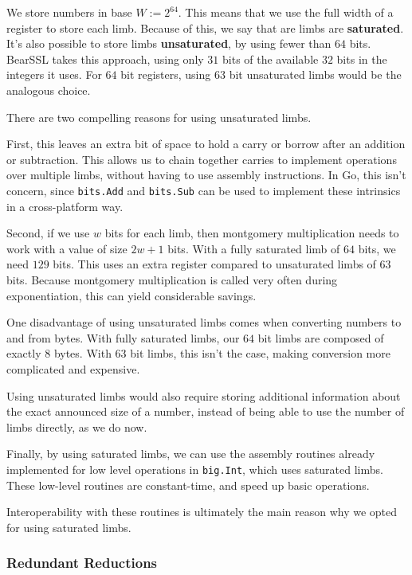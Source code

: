 \documentclass[11pt, a4paper]{article} %
\begin{document}
{We store numbers in base
$W := 2^{64}$. This means that we use the full width of a register
to store each limb. Because of this, we say that are limbs
are \textbf{saturated}. It's also possible to store
limbs \textbf{unsaturated}, by using fewer than $64$ bits.
BearSSL 
\cite{pornin_bearssl_2020-1}
takes this approach, using only $31$ bits of the available $32$ bits
in the integers it uses. For $64$ bit registers, using $63$ bit unsaturated
limbs would be the analogous choice.

There are two compelling reasons for using unsaturated limbs.

First, this leaves an extra bit of space to hold a carry
or borrow after an addition or subtraction. This allows
us to chain together carries to implement operations over multiple
limbs, without having to use assembly instructions. In Go,
this isn't concern, since \texttt{bits.Add} and
\texttt{bits.Sub} can be used to implement these intrinsics
in a cross-platform way.

Second, if we use $w$ bits for each limb, then montgomery
multiplication needs to work with a value of size $2w + 1$ bits. With a fully
saturated limb of $64$ bits, we need $129$ bits. This uses
an extra register compared to unsaturated limbs of $63$ bits. Because
montgomery multiplication is called very often during exponentiation,
this can yield considerable savings.

One disadvantage of using unsaturated limbs comes when converting
numbers to and from bytes. With fully saturated limbs, our
$64$ bit limbs are composed of exactly $8$ bytes. With $63$ bit limbs,
this isn't the case, making conversion more
complicated and expensive.

Using unsaturated limbs would
also require storing additional information about the exact
announced size of a number, instead of being able to use
the number of limbs directly, as we do now.

Finally, by using saturated limbs, we can use the assembly routines
already implemented for low level operations
in \texttt{big.Int}, which uses saturated limbs. These low-level
routines are constant-time, and speed up basic operations.

Interoperability with these routines
is ultimately the main reason why we opted
for using saturated limbs.

\subsubsection{Redundant Reductions}

}
\end{document}

